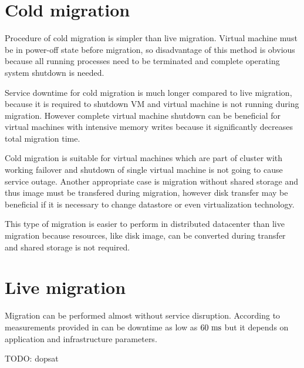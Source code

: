 \section{Cold migration}
Procedure of cold migration is simpler than live migration. Virtual machine must be in power-off state before migration, so disadvantage of this method is obvious because all running processes need to be terminated and complete operating system shutdown is needed.

Service downtime for cold migration is much longer compared to live migration, because it is required to shutdown \Ac{VM} and virtual machine is not running during migration. However complete virtual machine shutdown can be beneficial for virtual machines with intensive memory writes because it significantly decreases total migration time. 

Cold migration is suitable for virtual machines which are part of cluster with working failover and shutdown of single virtual machine is not going to cause service outage. Another appropriate case is migration without shared storage and thus image must be transfered during migration, however disk transfer may be beneficial if it is necessary to change datastore or even virtualization technology.

This type of migration is easier to perform in distributed datacenter than live migration because resources, like disk image, can be converted during transfer and shared storage is not required.


\section{Live migration}
Migration can be performed  almost without service disruption. According to measurements provided in \cite{live-migration-of-vms} can be downtime as low as $60~\mathrm{ms}$ but it depends on application and infrastructure parameters.

TODO: dopsat
